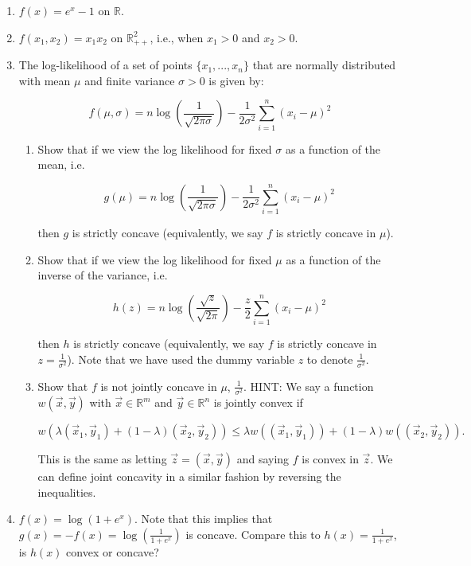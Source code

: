 \documentclass[
  12pt,
]{fphw}
\begin{document}
\begin{enumerate}
\item[(a)] $f(x) = e^x - 1$ on $\mathbb{R}$.

\item[(b)] $f(x_1, x_2) = x_1 x_2$ on $\mathbb{R}_{++}^2$, i.e., when $x_1 > 0$ and $x_2 > 0$.

\item[(c)] The log-likelihood of a set of points $\{x_1, . . . , x_n\}$ that are normally distributed with mean $\mu$ and finite variance $\sigma > 0$ is given by:

\[
f(\mu, \sigma) =
n \log \left(
\frac{1}{\sqrt{2\pi\sigma}}
\right)
-
\frac{1}{2\sigma^2}
\sum_{i=1}^{n} (x_i - \mu)^2
\]

\begin{enumerate}

\item[(i)] Show that if we view the log likelihood for fixed $\sigma$ as a function of the mean, i.e.

\[
g(\mu) =
n \log
\left(
\frac{1}{\sqrt{2\pi\sigma}}
\right)
-
\frac{1}{2\sigma^2}
\sum_{i=1}^{n} (x_i - \mu)^2
\]

then $g$ is strictly concave (equivalently, we say $f$ is strictly concave in $\mu$).

\item[(ii)] Show that if we view the log likelihood for fixed $\mu$ as a function of the inverse of the variance, i.e.

\[
h(z) =
n \log
\left(
\frac{\sqrt{z}}{\sqrt{2\pi}}
\right)
-
\frac{z}{2}
\sum_{i=1}^{n} (x_i - \mu)^2
\]

then $h$ is strictly concave (equivalently, we say $f$ is strictly concave in $z = \frac{1}{\sigma^2}$). Note that we have used the dummy variable $z$ to denote $\frac{1}{\sigma^2}$.

\item[(iii)] Show that $f$ is not jointly concave in $\mu$, $\frac{1}{\sigma^2}$. HINT: We say a function $w(\vec{x}, \vec{y})$ with $\vec{x} \in \mathbb{R}^m$ and $\vec{y} \in \mathbb{R}^n$ is jointly convex if

\[
w(\lambda(\vec{x}_1, \vec{y}_1) + (1-\lambda)(\vec{x}_2, \vec{y}_2))
\le
\lambda w((\vec{x}_1, \vec{y}_1)) + (1-\lambda) w((\vec{x}_2, \vec{y}_2)).
\]

This is the same as letting $\vec{z} = (\vec{x}, \vec{y})$ and saying $f$ is convex in $\vec{z}$. We can define joint concavity in a similar fashion by reversing the inequalities.

\end{enumerate}

\item[(d)] $f(x) = \log(1 + e^x)$. Note that this implies that $g(x) = -f(x) = \log\left(\frac{1}{1+e^x}\right)$ is concave. Compare this to $h(x) = \frac{1}{1+e^x}$, is $h(x)$ convex or concave?

\end{enumerate}
\end{document}
